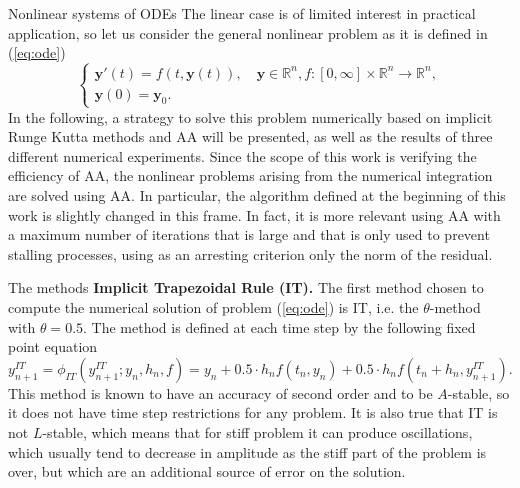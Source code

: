 \documentclass{article}
\begin{document}
\begin{section}{Nonlinear systems of ODEs}\label{subsec:nonlin}
The linear case is of limited interest in practical application, so let us consider the general nonlinear problem as it is defined in (\ref{eq:ode})
\begin{equation*}
	\begin{cases}
		\textbf{y}'(t) = f(t,\textbf{y}(t)), \quad \textbf{y}\in\mathbb{R}^n, f: [0,\infty] \times \mathbb{R}^n \rightarrow \mathbb{R}^n,\\
		\textbf{y}(0) =  \textbf{y}_0.
	\end{cases}
\end{equation*}
In the following, a strategy to solve this problem numerically based on implicit Runge Kutta methods and AA will be presented, as well as the results of three different numerical experiments. Since the scope of this work is verifying the efficiency of AA, the nonlinear problems arising from the numerical integration are solved using AA. In particular, the algorithm defined at the beginning of this work is slightly changed in this frame. In fact, it is more relevant using AA with a maximum number of iterations that is large and that is only used to prevent stalling processes, using as an arresting criterion only the norm of the residual.

\begin{subsection}{The methods}
\textbf{Implicit Trapezoidal Rule (IT).} The first method chosen to compute the numerical solution of problem (\ref{eq:ode}) is IT, i.e. the $\theta$-method with $\theta = 0.5$. The method is defined at each time step by the following fixed point equation
\begin{equation*}
        y_{n+1}^{IT} = \phi_{IT}(y_{n+1}^{IT}; y_n, h_n, f) = y_n + 0.5 \cdot h_n f(t_n,y_n) + 0.5 \cdot h_n f(t_{n}+h_{n},y_{n+1}^{IT}).
\end{equation*} This method is known to have an accuracy of second order and to be $A$-stable, so it does not have time step restrictions for any problem. It is also true that IT is not $L$-stable, which means that for stiff problem it can produce oscillations, which usually tend to decrease in amplitude as the stiff part of the problem is over, but which are an additional source of error on the solution. \\


\end{subsection}
\end{section}
\end{document}
